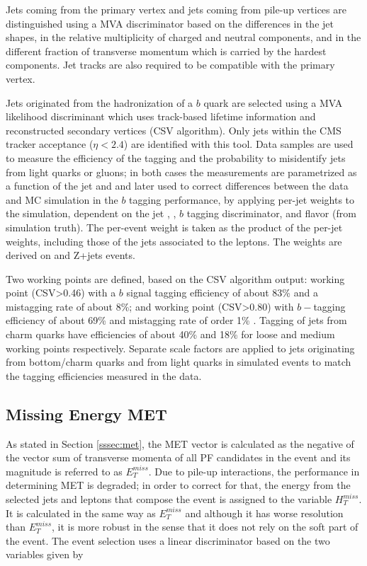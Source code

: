Jets coming from the primary vertex and jets coming from pile-up vertices are distinguished using a MVA discriminator based on the differences in the jet shapes, in the relative multiplicity of charged and neutral components, and in the different fraction of transverse momentum which is carried by the hardest components. Jet tracks are also required to be compatible with the primary
vertex.

Jets originated from the hadronization of a $b$ quark are selected using a MVA likelihood discriminant which uses track-based lifetime information and reconstructed secondary vertices (CSV algorithm). Only jets within the CMS tracker acceptance ($\eta < 2.4$) are identified with this tool. Data samples are used to measure the efficiency of the \bjet tagging and the probability to misidentify jets from light quarks or gluons; in both cases the measurements are parametrized as a function of the jet \pt and \etac and later used to correct differences between the data and MC simulation in the $b$ tagging performance, by applying per-jet weights to the simulation, dependent on the jet \pt, \etac, $b$ tagging discriminator, and flavor (from simulation truth)\cite{btag_corr}. The per-event weight is taken as the product of the per-jet weights, including those of the jets associated to the leptons. The weights are derived on \ttbar and Z+jets events.

Two working points are defined, based on the CSV algorithm output:  working point (CSV>0.46) with a $b$ signal tagging efficiency of about 83\% and a mistagging rate of about 8\%; and  working point (CSV>0.80) with $b-$tagging efficiency of about 69\% and mistagging rate of order 1\% \cite{btag_points}. Tagging of jets from charm quarks have efficiencies of about 40\%  and 18\% for loose and medium working points respectively. Separate scale factors are applied to jets originating from bottom/charm quarks and from light quarks in simulated events to match the tagging efficiencies measured in the data.



\subsection{Missing Energy MET}

As stated in Section \ref{sssec:met}, the MET vector is calculated as the negative of the vector sum of transverse momenta of all PF candidates in the event and its magnitude is referred to as $E_T^{miss}$. Due to pile-up interactions, the performance in determining MET is degraded; in order to correct for that, the energy from the selected jets and leptons that compose the event is assigned to the variable $H_T^{miss}$. It is calculated in the same way as  $E_T^{miss}$ and although it has worse resolution than $E_T^{miss}$, it is more robust in the sense that it does not rely on the soft part of the event. The event selection uses a linear discriminator based on the two variables given by 

